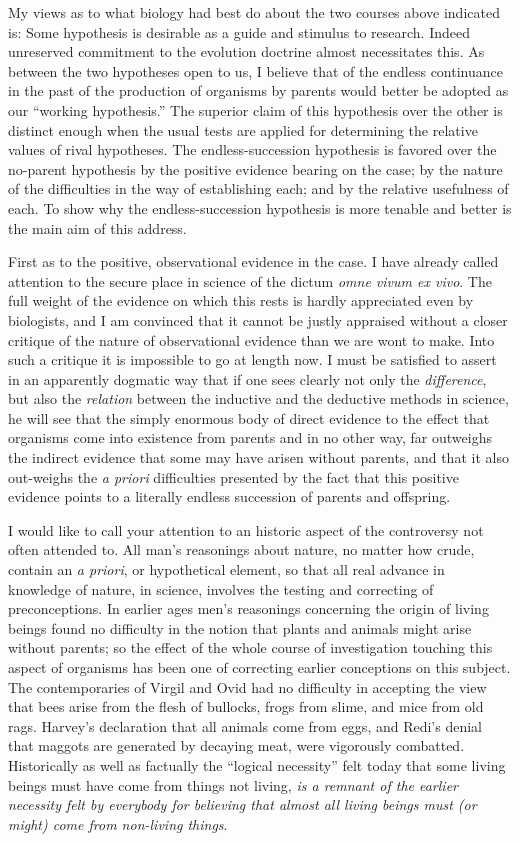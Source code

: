 \documentclass[a4paper, 11pt, oneside, polutonikogreek, english, landscape]{article}
\begin{document}
My views as to what biology had best do about the two courses above indicated is: Some hypothesis is desirable as a guide and stimulus to research. Indeed unreserved commitment to the evolution doctrine almost necessitates this. As between the two hypotheses open to us, I believe that of the endless continuance in the past of the production of organisms by parents would better be adopted as our ``working hypothesis.'' The superior claim of this hypothesis over the other is distinct enough when the usual tests are applied for determining the relative values of rival hypotheses. The endless-succession hypothesis is favored over the no-parent hypothesis by the positive evidence bearing on the case; by the nature of the difficulties in the way of establishing each; and by the relative usefulness of each. To show why the endless-succession hypothesis is more tenable and better is the main aim of this address.

First as to the positive, observational evidence in the case. I have already called attention to the secure place in science of the dictum \emph{omne vivum ex vivo}. The full weight of the evidence on which this rests is hardly appreciated even by biologists, and I am convinced that it cannot be justly appraised without a closer critique of the nature of observational evidence than we are wont to make. Into such a critique it is impossible to go at length now. I must be satisfied to assert in an apparently dogmatic way that if one sees clearly not only the \emph{difference}, but also the \emph{relation} between the inductive and the deductive methods in science, he will see that the simply enormous body of direct evidence to the effect that organisms come into existence from parents and in no other way, far outweighs the indirect evidence that some may have arisen without parents, and that it also out-weighs the \emph{a priori} difficulties presented by the fact that this positive evidence points to a literally endless succession of parents and offspring.

I would like to call your attention to an historic aspect of the controversy not often attended to. All man's reasonings about nature, no matter how crude, contain an \emph{a priori}, or hypothetical element, so that all real advance in knowledge of nature, in science, involves the testing and correcting of preconceptions. In earlier ages men's reasonings concerning the origin of living beings found no difficulty in the notion that plants and animals might arise without parents; so the effect of the whole course of investigation touching this aspect of organisms has been one of correcting earlier conceptions on this subject. The contemporaries of Virgil and Ovid had no difficulty in accepting the view that bees arise from the flesh of bullocks, frogs from slime, and mice from old rags. Harvey's declaration that all animals come from eggs, and Redi's denial that maggots are generated by decaying meat, were vigorously combatted. Historically as well as factually the ``logical necessity'' felt today that some living beings must have come from things not living, \emph{is a remnant of the earlier necessity felt by everybody for believing that almost all living beings must (or might) come from non-living things}.
\end{document}
